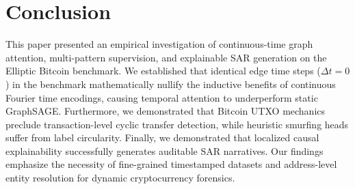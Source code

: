 \documentclass[conference]{IEEEtran}
\begin{document}
\section{Conclusion}
This paper presented an empirical investigation of continuous-time graph attention, multi-pattern supervision, and explainable SAR generation on the Elliptic Bitcoin benchmark. We established that identical edge time steps ($\Delta t = 0$) in the benchmark mathematically nullify the inductive benefits of continuous Fourier time encodings, causing temporal attention to underperform static GraphSAGE. Furthermore, we demonstrated that Bitcoin UTXO mechanics preclude transaction-level cyclic transfer detection, while heuristic smurfing heads suffer from label circularity. Finally, we demonstrated that localized causal explainability successfully generates auditable SAR narratives. Our findings emphasize the necessity of fine-grained timestamped datasets and address-level entity resolution for dynamic cryptocurrency forensics.



\end{document}
